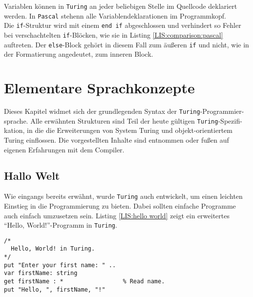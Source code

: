 Variablen k\"onnen in \texttt{Turing} an jeder beliebigen Stelle im Quellcode deklariert werden. In \texttt{Pascal} stehenn alle Variablendeklarationen im Programmkopf. \\
Die \lstinline{if}-Struktur wird mit einem \lstinline{end if} abgeschlossen und verhindert so Fehler bei verschachtelten \lstinline{if}-Bl\"ocken, wie sie in Listing \ref{LIS:comparison:pascal} auftreten. Der \lstinline{else}-Block geh\"ort in diesem Fall zum \"au\ss{}eren \lstinline{if} und nicht, wie in der Formatierung angedeutet, zum inneren Block.

\section{Elementare Sprachkonzepte}
\label{chap:basics}

Dieses Kapitel widmet sich der grundlegenden Syntax der \texttt{Turing}-Programmier-sprache. Alle erw\"ahnten Strukturen sind Teil der   heute g\"ultigen \texttt{Turing}-Spezifi-kation, in die die Erweiterungen von System Turing und objekt-orientiertem Turing einflossen. Die vorgestellten Inhalte sind \cite{Hume:01} entnommen oder fu\ss{}en auf eigenen Erfahrungen mit dem Compiler.

\subsection{Hallo Welt}
Wie eingangs bereits erw\"ahnt, wurde \texttt{Turing} auch entwickelt, um einen leichten Einstieg in die Programmierung zu bieten. Dabei sollten einfache Programme auch einfach umzusetzen sein. Listing \ref{LIS:hello world} zeigt ein erweitertes ``Hello, World!''-Programm in \texttt{Turing}.

\lstset{label=LIS:hello world}
\begin{table}[h!]
\begin{lstlisting}
/*
  Hello, World! in Turing.
*/
put "Enter your first name: " ..
var firstName: string
get firstName : *                 % Read name.
put "Hello, ", firstName, "!"
\end{lstlisting}
\end{table}

